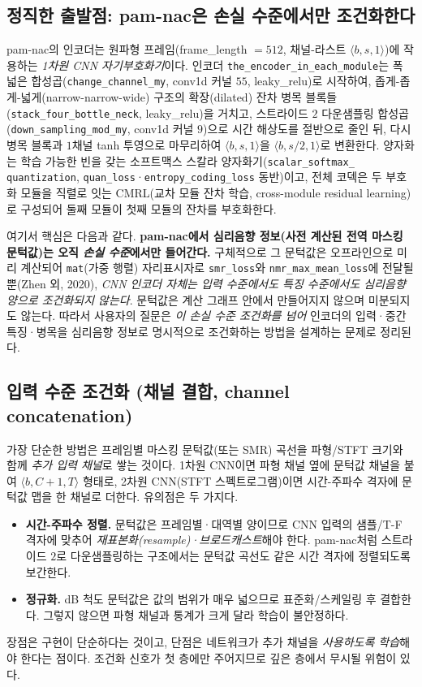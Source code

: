 \documentclass[11pt,a4paper]{article}
\begin{document}
\subsection{정직한 출발점: pam-nac은 손실 수준에서만 조건화한다}
pam-nac\cite{pamnac}의 인코더는 원파형 프레임(frame\_length $=512$,
채널-라스트 $\langle b, s, 1\rangle$)에 작용하는 \emph{1차원 CNN
자기부호화기}이다. 인코더 \texttt{the\_encoder\_in\_each\_module}는 폭 넓은
합성곱(\texttt{change\_channel\_my}, conv1d 커널 $55$, leaky\_relu)로 시작하여,
좁게-좁게-넓게(narrow-narrow-wide) 구조의 확장(dilated) 잔차 병목 블록들
(\texttt{stack\_four\_bottle\_neck}, leaky\_relu)을 거치고, 스트라이드 $2$
다운샘플링 합성곱(\texttt{down\_sampling\_mod\_my}, conv1d 커널 $9$)으로 시간
해상도를 절반으로 줄인 뒤, 다시 병목 블록과 $1$채널 tanh 투영으로 마무리하여
$\langle b, s, 1\rangle$을 $\langle b, s/2, 1\rangle$로 변환한다. 양자화는
학습 가능한 빈을 갖는 소프트맥스 스칼라 양자화기(\texttt{scalar\_softmax\_%
quantization}, \texttt{quan\_loss}·\texttt{entropy\_coding\_loss} 동반)이고,
전체 코덱은 두 부호화 모듈을 직렬로 잇는 CMRL(교차 모듈 잔차 학습, cross-module
residual learning)로 구성되어 둘째 모듈이 첫째 모듈의 잔차를 부호화한다.

여기서 핵심은 다음과 같다. \textbf{pam-nac에서 심리음향 정보(사전 계산된 전역
마스킹 문턱값)는 오직 \emph{손실 수준}에서만 들어간다.} 구체적으로 그 문턱값은
오프라인으로 미리 계산되어 \texttt{mat}(가중 행렬) 자리표시자로 \texttt{smr\_loss}와
\texttt{nmr\_max\_mean\_loss}에 전달될 뿐(Zhen 외, 2020\cite{zhen2020}),
\emph{CNN 인코더 자체는 입력 수준에서도 특징 수준에서도 심리음향 양으로 조건화되지
않는다}. 문턱값은 계산 그래프 안에서 만들어지지 않으며 미분되지도 않는다. 따라서
사용자의 질문은 \emph{이 손실 수준 조건화를 넘어} 인코더의 입력·중간 특징·병목을
심리음향 정보로 명시적으로 조건화하는 방법을 설계하는 문제로 정리된다.

\subsection{입력 수준 조건화 (채널 결합, channel concatenation)}
가장 단순한 방법은 프레임별 마스킹 문턱값(또는 SMR) 곡선을 파형/STFT 크기와 함께
\emph{추가 입력 채널}로 쌓는 것이다. 1차원 CNN이면 파형 채널 옆에 문턱값 채널을
붙여 $\langle b, C{+}1, T\rangle$ 형태로, 2차원 CNN(STFT 스펙트로그램)이면 시간-주파수
격자에 문턱값 맵을 한 채널로 더한다. 유의점은 두 가지다.
\begin{itemize}
  \item \textbf{시간-주파수 정렬.} 문턱값은 프레임별·대역별 양이므로 CNN 입력의
        샘플/T-F 격자에 맞추어 \emph{재표본화(resample)·브로드캐스트}해야 한다.
        pam-nac처럼 스트라이드 $2$로 다운샘플링하는 구조에서는 문턱값 곡선도
        같은 시간 격자에 정렬되도록 보간한다.
  \item \textbf{정규화.} dB 척도 문턱값은 값의 범위가 매우 넓으므로 표준화/스케일링
        후 결합한다. 그렇지 않으면 파형 채널과 통계가 크게 달라 학습이 불안정하다.
\end{itemize}
장점은 구현이 단순하다는 것이고, 단점은 네트워크가 추가 채널을 \emph{사용하도록
학습}해야 한다는 점이다. 조건화 신호가 첫 층에만 주어지므로 깊은 층에서 무시될
위험이 있다.
\end{document}
